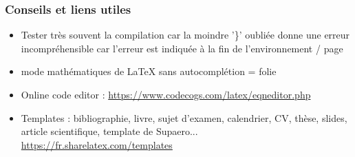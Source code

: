 \documentclass{beamer}
\begin{document}
\begin{frame}[fragile]
    \frametitle{Conseils et liens utiles}
    \begin{itemize}
        \item<1-> Tester très souvent la compilation car la moindre '\}' oubliée donne une erreur incompréhensible car l'erreur est indiquée à la fin de l'environnement / page 
        \item<2-> mode mathématiques de LaTeX sans autocomplétion = folie
        \item<3-> Online code editor : \url{https://www.codecogs.com/latex/eqneditor.php}
        \item<4-> Templates : bibliographie, livre, sujet d'examen, calendrier, CV, thèse, slides, article scientifique, template de Supaero...
        \url{https://fr.sharelatex.com/templates}
    \end{itemize}
\end{frame}
\end{document}

